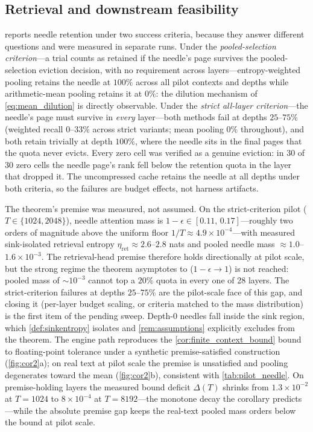 \documentclass[final,5p,times,twocolumn]{elsarticle}
\theoremstyle{definition}
\theoremstyle{remark}
\begin{document}
\subsection{Retrieval and downstream feasibility}
\label{subsec:pilot-retrieval}

 reports needle retention under two success
criteria, because they answer different questions and were measured in
separate runs. Under the \emph{pooled-selection criterion}---a trial
counts as retained if the needle's page survives the pooled-selection
eviction decision, with no requirement across layers---entropy-weighted
pooling retains the needle at $100\%$ across all pilot contexts and
depths while arithmetic-mean pooling retains it at $0\%$: the dilution
mechanism of \cref{eq:mean_dilution} is directly observable. Under the
\emph{strict all-layer criterion}---the needle's page must survive in
\emph{every} layer---both methods fail at depths $25$--$75\%$ (weighted
recall $0$--$33\%$ across strict variants; mean pooling $0\%$ throughout), and both retain trivially at depth $100\%$, where the
needle sits in the final pages that the quota never evicts. Every zero
cell was verified as a genuine eviction: in 30 of 30 zero cells the
needle page's rank fell below the retention quota in the layer that
dropped it. The uncompressed cache retains the needle at all depths
under both criteria, so the failures are budget effects, not harness
artifacts.

The theorem's premise was measured, not assumed. On the strict-criterion
pilot ($T\in\{1024,2048\}$), needle attention mass is
 $1-\epsilon \in [0.11,\,0.17]$---roughly two orders of magnitude above
the uniform floor $1/T \approx 4.9\times 10^{-4}$---with measured
sink-isolated retrieval entropy $\eta_{\mathrm{ret}}\approx 2.6$--$2.8$ nats and pooled needle mass $\approx 1.0$--$1.6\times 10^{-3}$. The
retrieval-head premise therefore holds directionally at pilot scale,
but the strong regime the theorem asymptotes to ($1-\epsilon \to 1$) is
not reached: pooled mass of $\sim 10^{-3}$ cannot top a $20\%$ quota in
every one of 28 layers. The strict-criterion failures at depths
 $25$--$75\%$ are the pilot-scale face of this gap, and closing it
(per-layer budget scaling, or criteria matched to the mass
distribution) is the first item of the pending sweep. Depth-$0$ needles fall inside the sink region, which \cref{def:sinkentropy}
isolates and \cref{rem:assumptions} explicitly excludes from the
theorem. The engine path reproduces the \cref{cor:finite_context_bound}
bound to floating-point tolerance under a synthetic premise-satisfied
construction (\cref{fig:cor2}a); on real text at pilot scale the
premise is unsatisfied and pooling degenerates toward the mean
(\cref{fig:cor2}b), consistent with \cref{tab:pilot_needle}. On
premise-holding layers the measured bound deficit $\Delta(T)$ shrinks
from $1.3\times 10^{-2}$ at $T{=}1024$ to $8\times 10^{-4}$ at
 $T{=}8192$---the monotone decay the corollary predicts---while the
absolute premise gap keeps the real-text pooled mass orders below the
bound at pilot scale.
\end{document}
